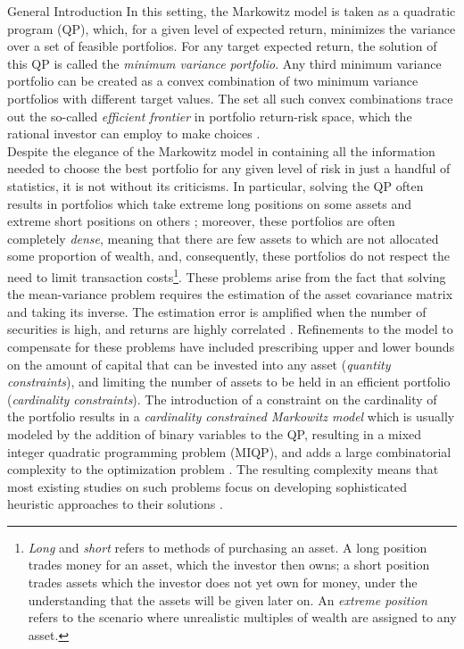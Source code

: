 \begin{section}{General Introduction}
In this setting, the Markowitz model is taken as a quadratic program (QP), which, for a given level of expected return, minimizes the variance over a set of feasible portfolios. For any target expected return, the solution of this QP is called the \textit{minimum variance portfolio}. Any third minimum variance portfolio can be created as a convex combination of two minimum variance portfolios with different target values. The set all such convex combinations trace out the so-called \textit{efficient frontier} in portfolio return-risk space, which the rational investor can employ to make choices \cite{Brito}. \\

Despite the elegance of the Markowitz model in containing all the information needed to choose the best portfolio for any given level of risk in just a handful of statistics, it is not without its criticisms. In particular, solving the QP often results in portfolios which take extreme long positions on some assets and extreme short positions on others \cite{Jagannathan2002}; moreover, these portfolios are often completely \textit{dense}, meaning that there are few assets to which are not allocated some proportion of wealth, and, consequently, these portfolios do not respect the need to limit transaction costs\footnote{\textit{Long} and \textit{short} refers to methods of purchasing an asset. A long position trades money for an asset, which the investor then owns; a short position trades assets which the investor does not yet own for money, under the understanding that the assets will be given later on. An \textit{extreme position} refers to the scenario where unrealistic multiples of wealth are assigned to any asset.}. These problems arise from the fact that solving the mean-variance problem requires the estimation of the asset covariance matrix and taking its inverse. The estimation error is amplified when the number of securities is high, and returns are highly correlated \cite{Carrascoa}.   Refinements to the model to compensate for these problems have included prescribing upper and lower bounds on the amount of capital that can be invested into any asset (\textit{quantity constraints}), and limiting the number of assets to be held in an efficient portfolio (\textit{cardinality constraints}). The introduction of a constraint on the cardinality of the portfolio  results in a  \textit{cardinality constrained Markowitz model} which is usually modeled by the addition of binary variables to the QP, resulting in a mixed integer quadratic programming problem (MIQP), and adds a large combinatorial complexity to the optimization problem \cite{Brito}. The resulting complexity means that most existing studies on such problems focus on developing sophisticated heuristic approaches to their solutions \cite{Takeda2013}.\\


\end{section}
